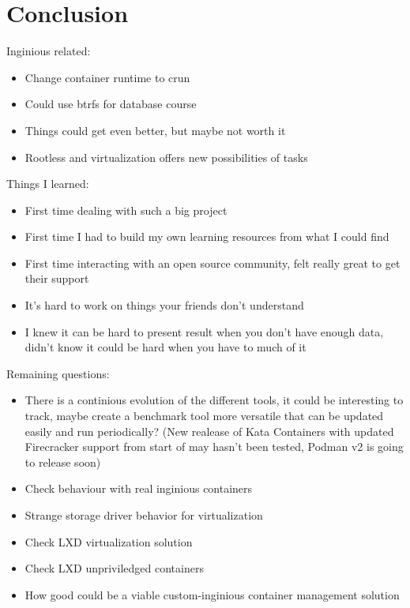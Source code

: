 \chapter{Conclusion}


Inginious related:
\begin{itemize}
  \item Change container runtime to crun
  \item Could use btrfs for database course
  \item Things could get even better, but maybe not worth it
  \item Rootless and virtualization offers new possibilities of tasks
\end{itemize}


Things I learned:
\begin{itemize}
  \item First time dealing with such a big project
  \item First time I had to build my own learning resources from what I could find
  \item First time interacting with an open source community, felt really great to get their support
  \item It's hard to work on things your friends don't understand
  \item I knew it can be hard to present result when you don't have enough data, didn't know it could be hard when you have to much of it
\end{itemize}


Remaining questions:
\begin{itemize}
  \item There is a continious evolution of the different tools, it could be interesting to track, maybe create a benchmark tool more versatile that can be updated easily and run periodically?  (New realease of Kata Containers with updated Firecracker support from start of may hasn't been tested, Podman v2 is going to release soon)
  \item Check behaviour with real inginious containers
  \item Strange storage driver behavior for virtualization
  \item Check LXD virtualization solution
  \item Check LXD unpriviledged containers
  \item How good could be a viable custom-inginious container management solution
\end{itemize}
